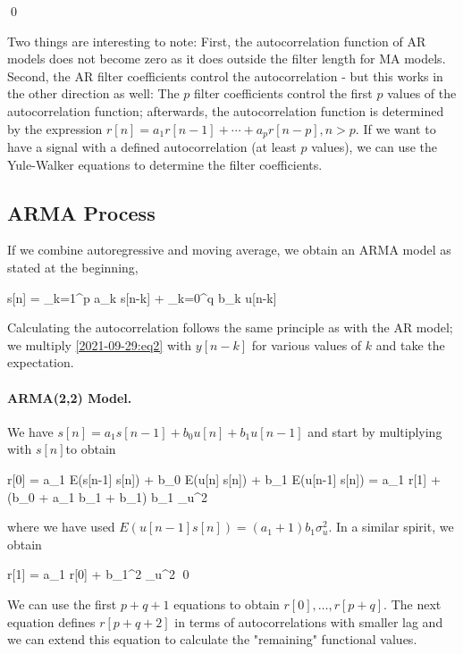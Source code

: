 \qed

Two things are interesting to note: First, the autocorrelation function of AR models does not become zero as it does outside the filter length for MA models. Second, the AR filter coefficients control the autocorrelation - but this works in the other direction as well: The $p$ filter coefficients control the first $p$ values of the autocorrelation function; afterwards, the autocorrelation function is determined by the expression $r[n] = a_1 r[n-1] + \cdots + a_p r[n-p], n>p$. If we want to have a signal with a defined autocorrelation (at least $p$ values), we can use the Yule-Walker equations to determine the filter coefficients.


\subsection{ARMA Process}

If we combine autoregressive and moving average, we obtain an ARMA model as stated at the beginning,

\be\label{2021-09-29:eq2}
s[n] = \sum_{k=1}^p a_k s[n-k] + \sum_{k=0}^q b_k u[n-k]
\ee

Calculating the autocorrelation follows the same principle as with the AR model; we multiply \eqref{2021-09-29:eq2} with $y[n-k]$ for various values of $k$ and take the expectation.

\paragraph{ARMA(2,2) Model.} We have $s[n] = a_1 s[n-1] + b_0 u[n] + b_1 u[n-1]$ and start by multiplying with $s[n]$to obtain

\bee
r[0] = a_1 E(s[n-1] s[n]) + b_0 E(u[n] s[n]) + b_1 E(u[n-1] s[n]) = a_1 r[1] + (b_0 + a_1 b_1 + b_1) b_1 \sigma_u^2
\eee

where we have used $E(u[n-1] s[n]) = (a_1 +1) b_1 \sigma_u^2$. In a similar spirit, we obtain

\bee
r[1] = a_1 r[0] + b_1^2 \sigma_u^2 \qed
\eee

We can use the first $p+q+1$ equations to obtain $r[0],\ldots,r[p+q]$. The next equation defines $r[p+q+2]$ in terms of autocorrelations with smaller lag and we can extend this equation to calculate the "remaining" functional values.

